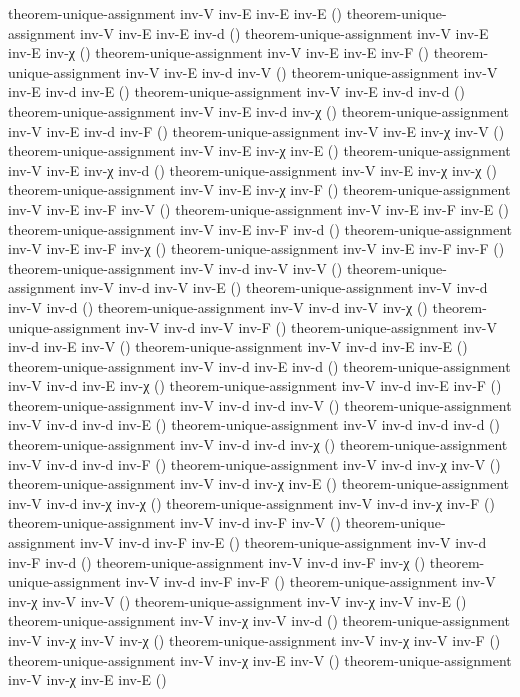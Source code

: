 \documentclass[11pt,a4paper]{article}
\begin{document}
\begin{code}
theorem-unique-assignment inv-V inv-E inv-E inv-E ()
theorem-unique-assignment inv-V inv-E inv-E inv-d ()
theorem-unique-assignment inv-V inv-E inv-E inv-χ ()
theorem-unique-assignment inv-V inv-E inv-E inv-F ()
theorem-unique-assignment inv-V inv-E inv-d inv-V ()
theorem-unique-assignment inv-V inv-E inv-d inv-E ()
theorem-unique-assignment inv-V inv-E inv-d inv-d ()
theorem-unique-assignment inv-V inv-E inv-d inv-χ ()
theorem-unique-assignment inv-V inv-E inv-d inv-F ()
theorem-unique-assignment inv-V inv-E inv-χ inv-V ()
theorem-unique-assignment inv-V inv-E inv-χ inv-E ()
theorem-unique-assignment inv-V inv-E inv-χ inv-d ()
theorem-unique-assignment inv-V inv-E inv-χ inv-χ ()
theorem-unique-assignment inv-V inv-E inv-χ inv-F ()
theorem-unique-assignment inv-V inv-E inv-F inv-V ()
theorem-unique-assignment inv-V inv-E inv-F inv-E ()
theorem-unique-assignment inv-V inv-E inv-F inv-d ()
theorem-unique-assignment inv-V inv-E inv-F inv-χ ()
theorem-unique-assignment inv-V inv-E inv-F inv-F ()
theorem-unique-assignment inv-V inv-d inv-V inv-V ()
theorem-unique-assignment inv-V inv-d inv-V inv-E ()
theorem-unique-assignment inv-V inv-d inv-V inv-d ()
theorem-unique-assignment inv-V inv-d inv-V inv-χ ()
theorem-unique-assignment inv-V inv-d inv-V inv-F ()
theorem-unique-assignment inv-V inv-d inv-E inv-V ()
theorem-unique-assignment inv-V inv-d inv-E inv-E ()
theorem-unique-assignment inv-V inv-d inv-E inv-d ()
theorem-unique-assignment inv-V inv-d inv-E inv-χ ()
theorem-unique-assignment inv-V inv-d inv-E inv-F ()
theorem-unique-assignment inv-V inv-d inv-d inv-V ()
theorem-unique-assignment inv-V inv-d inv-d inv-E ()
theorem-unique-assignment inv-V inv-d inv-d inv-d ()
theorem-unique-assignment inv-V inv-d inv-d inv-χ ()
theorem-unique-assignment inv-V inv-d inv-d inv-F ()
theorem-unique-assignment inv-V inv-d inv-χ inv-V ()
theorem-unique-assignment inv-V inv-d inv-χ inv-E ()
theorem-unique-assignment inv-V inv-d inv-χ inv-χ ()
theorem-unique-assignment inv-V inv-d inv-χ inv-F ()
theorem-unique-assignment inv-V inv-d inv-F inv-V ()
theorem-unique-assignment inv-V inv-d inv-F inv-E ()
theorem-unique-assignment inv-V inv-d inv-F inv-d ()
theorem-unique-assignment inv-V inv-d inv-F inv-χ ()
theorem-unique-assignment inv-V inv-d inv-F inv-F ()
theorem-unique-assignment inv-V inv-χ inv-V inv-V ()
theorem-unique-assignment inv-V inv-χ inv-V inv-E ()
theorem-unique-assignment inv-V inv-χ inv-V inv-d ()
theorem-unique-assignment inv-V inv-χ inv-V inv-χ ()
theorem-unique-assignment inv-V inv-χ inv-V inv-F ()
theorem-unique-assignment inv-V inv-χ inv-E inv-V ()
theorem-unique-assignment inv-V inv-χ inv-E inv-E ()

\end{code}
\end{document}
